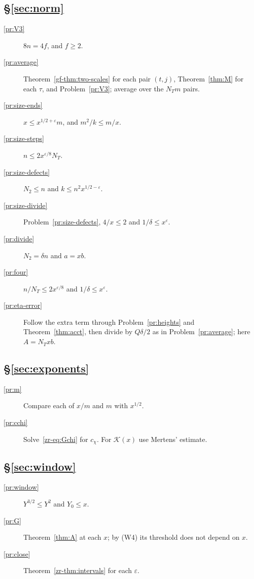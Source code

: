 \documentclass[reqno]{amsart}
\theoremstyle{definition}
\theoremstyle{plain}
\begin{document}
\subsection*{\S\ref{sec:norm}}
\begin{description}
\item[\ref{pr:V3}] \(8n = 4f\), and \(f \ge 2\).
\item[\ref{pr:average}] Theorem~\ref{gf-thm:two-scales} for each pair \((t,j)\), Theorem~\ref{thm:M} for each \(\tau\), and Problem~\ref{pr:V3}; average over the \(N_Tm\) pairs.
\item[\ref{pr:size-ends}] \(x \le x^{1/2+\varepsilon}m\), and \(m^2/k \le m/x\).
\item[\ref{pr:size-steps}] \(n \le 2x^{\varepsilon/8}N_T\).
\item[\ref{pr:size-defects}] \(N_2 \le n\) and \(k \le n^2x^{1/2-\varepsilon}\).
\item[\ref{pr:size-divide}] Problem~\ref{pr:size-defects}, \(4/x \le 2\) and \(1/\delta \le x^\varepsilon\).
\item[\ref{pr:divide}] \(N_2 = \delta n\) and \(a = xb\).
\item[\ref{pr:four}] \(n/N_T \le 2x^{\varepsilon/8}\) and \(1/\delta \le x^\varepsilon\).
\item[\ref{pr:eta-error}] Follow the extra term through Problem~\ref{pr:heights} and Theorem~\ref{thm:acct}, then divide by \(Q\delta/2\) as in Problem~\ref{pr:average}; here \(A = N_Txb\).
\end{description}

\subsection*{\S\ref{sec:exponents}}
\begin{description}
\item[\ref{pr:m}] Compare each of \(x/m\) and \(m\) with \(x^{1/2}\).
\item[\ref{pr:cchi}] Solve~\eqref{zr-eq:Gchi} for \(c_\chi\).  For \(\mathcal{K}(x)\) use Mertens' estimate.
\end{description}

\subsection*{\S\ref{sec:window}}
\begin{description}
\item[\ref{pr:window}] \(Y^{3/2} \le Y^2\) and \(Y_0 \le x\).
\item[\ref{pr:G}] Theorem~\ref{thm:A} at each \(x\); by (W4) its threshold does not depend on \(x\).
\item[\ref{pr:close}] Theorem~\ref{zr-thm:intervals} for each \(\varepsilon\).
\end{description}
\end{document}
